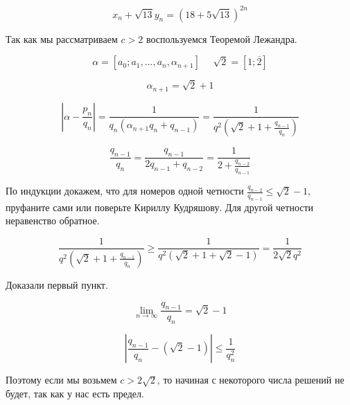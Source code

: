 \[x_n + \sqrt{13}y_n = (18 + 5 \sqrt{13})^{2n}\]


Так как мы рассматриваем $c > 2$ воспользуемся Теоремой Лежандра.

\[\alpha = [a_0; a_1, ..., a_n, \alpha_{n + 1}] \ \ \ \ \ \ \sqrt{2} = [1; \overline{2}]\]

\[\alpha_{n + 1} = \sqrt{2} + 1\]

\[|\alpha - \frac{p_n}{q_n}| = \frac{1}{q_n(\alpha_{n + 1}q_n + q_{n - 1})} = \frac{1}{q^2(\sqrt{2} + 1 + \frac{q_{n - 1}}{q_n})}\]

\[\frac{q_{n - 1}}{q_n} = \frac{q_{n - 1}}{2q_{n - 1} + q_{n - 2}} = \frac{1}{2 + \frac{q_{n - 2}}{q_{n - 1}}}\]


По индукции докажем, что для номеров одной четности $\frac{q_{n - 2}}{q_{n - 1}} \leq \sqrt{2} - 1$, пруфаните сами или поверьте Кириллу Кудряшову.
Для другой четности неравенство обратное.

\[\frac{1}{q^2(\sqrt{2} + 1 + \frac{q_{n - 1}}{q_n})} \geq \frac{1}{q^2(\sqrt{2} + 1 + \sqrt{2} - 1)} = \frac{1}{2\sqrt{2}q^2}\]

Доказали первый пункт.

\[\lim\limits_{n \to \infty} \frac{q_{n - 1}}{q_n} = \sqrt{2} - 1\]

\[|\frac{q_{n - 1}}{q_n} - (\sqrt{2} - 1)| \leq \frac{1}{q_n^2}\]

Поэтому если мы возьмем $c > 2 \sqrt{2}$, то начиная с некоторого числа решений не будет, так как у нас есть предел.
